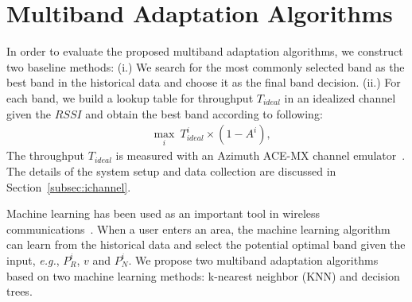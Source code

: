 
\section{Multiband Adaptation Algorithms}
\label{subsec:algorithms}

In order to evaluate the proposed multiband adaptation algorithms, 
we construct two baseline methods: (i.) We search for the
most commonly selected band as the best band in the historical data
and choose it as the final band decision. (ii.) For each band, we build 
a lookup table for throughput $T_{ideal}$ in an idealized channel given the $RSSI$ and obtain 
the best band according to following:
\begin{align}
&\max_i\ T_{ideal}^i\times(1-A^i),
\label{eq:baseline2}
\end{align}
The throughput $T_{ideal}$ is measured with an Azimuth ACE-MX channel emulator~\cite{AzimuthACE}. 
The details of the system setup and data collection are discussed in Section~\ref{subsec:ichannel}. 

Machine learning has been used as an important tool in wireless communications~\cite{haykin2005cognitive}. When a user enters an area, the machine
learning algorithm can learn from the historical data and
select the potential optimal band given the input, {\it e.g.}, $P_R^i$, $v$
and $P_N^i$. We propose two multiband adaptation algorithms based on
two machine learning methods: k-nearest neighbor (KNN) and decision trees.

